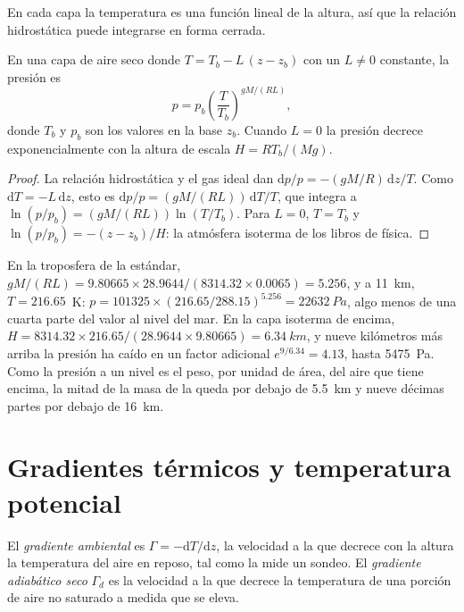 En cada capa la temperatura es una función lineal de la altura, así que la relación hidrostática puede integrarse en forma cerrada.

\begin{proposition}\label{prop:b1:fluid-envelopes-structure:layer-pressure}
En una capa de aire seco donde $T = T_b - L\,(z - z_b)$ con un $L \neq 0$ constante, la
presión es
\[
  p = p_b \left(\frac{T}{T_b}\right)^{gM/(RL)},
\]
donde $T_b$ y $p_b$ son los valores en la base $z_b$. Cuando $L = 0$ la presión decrece exponencialmente con la altura de escala $H = RT_b/(Mg)$.
\end{proposition}

\begin{proof}
La relación hidrostática y el gas ideal dan $\mathrm dp/p = -(gM/R)\,\mathrm
dz/T$. Como $\mathrm dT = -L\,\mathrm dz$, esto es $\mathrm dp/p =
(gM/(RL))\,\mathrm dT/T$, que integra a $\ln(p/p_b) = (gM/(RL))
\ln(T/T_b)$. Para $L = 0$, $T = T_b$ y $\ln(p/p_b) = -(z - z_b)/H$: la atmósfera isoterma de los libros de física.
\end{proof}

En la troposfera de la estándar, $gM/(RL) = 9.80665 \times 28.9644 /
(8314.32 \times 0.0065) = 5.256$, y a \qty{11}{km}, $T = 216.65$~K:
$p = \num{101325} \times (216.65/288.15)^{5.256} = \qty{22632}{Pa}$, algo
menos de una cuarta parte del valor al nivel del mar. En la capa isoterma de encima, $H =
8314.32 \times 216.65/(28.9644 \times 9.80665) = \qty{6.34}{km}$, y nueve
kilómetros más arriba la presión ha caído en un factor adicional $e^{9/6.34} =
4.13$, hasta \qty{5475}{Pa}. Como la presión a un nivel es el peso, por unidad de
área, del aire que tiene encima, la mitad de la masa de la  queda por debajo de \qty{5.5}{km} y nueve décimas partes por debajo de \qty{16}{km}.

\section{Gradientes térmicos y temperatura potencial}\label{sec:b1:fluid-envelopes-structure:lapse}

\begin{definition}\label{def:b1:fluid-envelopes-structure:lapse-rate}
El \emph{gradiente ambiental} es $\Gamma =
-\mathrm dT/\mathrm dz$, la velocidad a la que decrece con la altura la temperatura del aire en reposo, tal como la mide un sondeo. El \emph{gradiente adiabático
seco} $\Gamma_d$ es la velocidad a la que decrece la temperatura de una porción de aire no saturado a medida que se eleva.
\end{definition}

